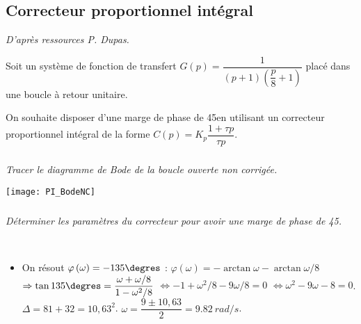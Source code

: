 \begin{multicols}{2}
%
%

\subsection*{Correcteur proportionnel intégral}
\textit{D'après ressources P. Dupas.}
\setcounter{exo}{0}

Soit un système de fonction de transfert $G(p)=\dfrac{1}{\left(p+1\right)\left(\dfrac{p}{8}+1\right)}$ placé dans une boucle à retour unitaire.

On souhaite disposer d'une marge de phase de 45\degres en utilisant un correcteur proportionnel intégral de la forme $C(p)=K_p\dfrac{1+\tau p}{\tau p}$.

\subparagraph{}\textit{Tracer le diagramme de Bode de la boucle ouverte non corrigée.}
\ifprof
\begin{corrige}
\begin{center}
\texttt{[image: PI\_BodeNC]}
\end{center}
\end{corrige}
\else
\fi

\subparagraph{}\textit{Déterminer les paramètres du correcteur pour avoir une marge de phase de 45\degres. }

\ifprof
\begin{corrige}~\\

\begin{itemize}
\item On résout $\varphi\left(\omega\right)=-135\degres$ : 
$\varphi\left(\omega\right)=-\arctan \omega-\arctan \omega/8 $ $\Rightarrow \tan 135\degres = \dfrac{\omega+\omega/8}{1-\omega^2/8}$ 
$\Leftrightarrow - 1+\omega^2/8-9\omega/8=0$ 
$\Leftrightarrow  \omega^2 -9\omega-8 =0$. 
$\Delta = 81+32=10,63^2$. 
$\omega = \dfrac{9\pm10,63}{2}=\SI{9,82}{rad/s}$.



\end{itemize}
\end{corrige}
\end{multicols}
